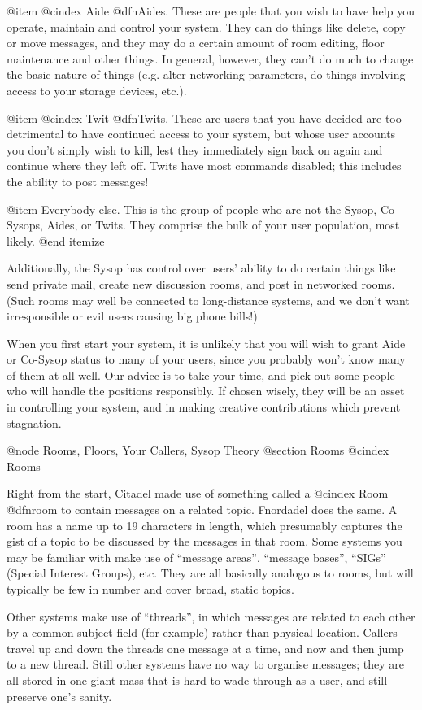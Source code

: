 @item
@cindex Aide
@dfn{Aides}.  These are people that you wish to have help you
operate, maintain and control your system.  They can do things
like delete, copy or move messages, and they may do a certain
amount of room editing, floor maintenance and other things.  In
general, however, they can't do much to change the basic nature
of things (e.g. alter networking parameters, do things involving
access to your storage devices, etc.).

@item
@cindex Twit
@dfn{Twits}.  These are users that you have decided are too
detrimental to have continued access to your system, but
whose user accounts you don't simply wish to kill, lest
they immediately sign back on again and continue where
they left off.  Twits have most commands disabled; this
includes the ability to post messages!

@item
Everybody else.  This is the group of people who are
not the Sysop, Co-Sysops, Aides, or Twits.  They comprise the bulk of
your user population, most likely.
@end itemize

Additionally, the Sysop has control over users' ability to do certain things like
send private mail, create new discussion rooms, and post in
networked rooms.  (Such rooms may well be connected to long-distance
systems, and we don't want irresponsible or evil
users causing big phone bills!)

When you first start your system, it is unlikely that you will
wish to grant Aide or Co-Sysop status to many of your users, since you probably
won't know many of them at all well.  Our advice is to take your time, and
pick out some people who will handle the positions responsibly.  If chosen
wisely, they will be an asset in controlling your system, and in making
creative contributions which prevent stagnation.

@node Rooms, Floors, Your Callers, Sysop Theory
@section Rooms
@cindex Rooms

Right from the start, Citadel made use of something called a
@cindex Room
@dfn{room} to contain messages on a related topic.  Fnordadel does
the same.  A room has a name up to 19 characters in length, which
presumably captures the gist of a topic to be discussed by the
messages in that room.  Some systems you may be familiar with make
use of ``message areas'', ``message bases'', ``SIGs'' (Special Interest
Groups), etc.  They are all basically analogous to rooms, but will
typically be few in number and cover broad, static topics.

Other systems make use of ``threads'', in which messages are
related to each other by a common subject field (for example) rather
than physical location.  Callers travel up and down the threads one
message at a time, and now and then jump to a new thread.  Still
other systems have no way to organise messages; they are all stored
in one giant mass that is hard to wade through as a user, and still
preserve one's sanity.

